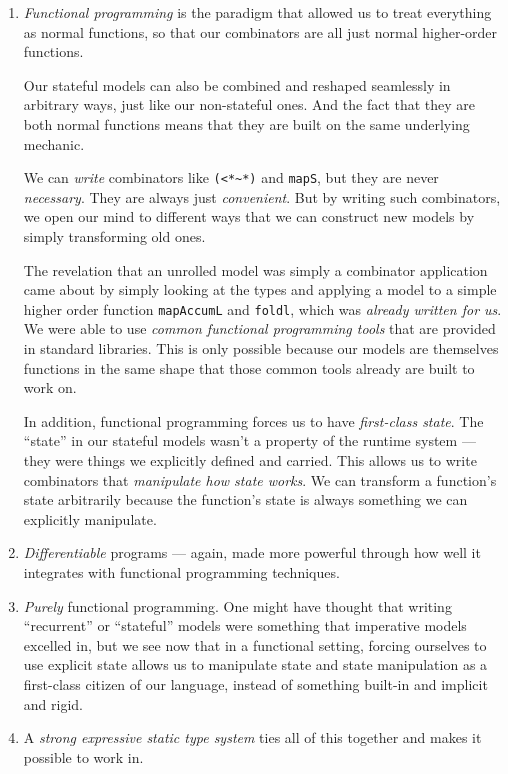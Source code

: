 \documentclass[]{article}
\begin{document}
\begin{enumerate}
\def\labelenumi{\arabic{enumi}.}
\item
  \emph{Functional programming} is the paradigm that allowed us to treat
  everything as normal functions, so that our combinators are all just normal
  higher-order functions.

  Our stateful models can also be combined and reshaped seamlessly in arbitrary
  ways, just like our non-stateful ones. And the fact that they are both normal
  functions means that they are built on the same underlying mechanic.

  We can \emph{write} combinators like \texttt{(\textless{}*\textasciitilde{}*)}
  and \texttt{mapS}, but they are never \emph{necessary}. They are always just
  \emph{convenient}. But by writing such combinators, we open our mind to
  different ways that we can construct new models by simply transforming old
  ones.

  The revelation that an unrolled model was simply a combinator application came
  about by simply looking at the types and applying a model to a simple higher
  order function \texttt{mapAccumL} and \texttt{foldl}, which was \emph{already
  written for us}. We were able to use \emph{common functional programming
  tools} that are provided in standard libraries. This is only possible because
  our models are themselves functions in the same shape that those common tools
  already are built to work on.

  In addition, functional programming forces us to have \emph{first-class
  state}. The ``state'' in our stateful models wasn't a property of the runtime
  system --- they were things we explicitly defined and carried. This allows us
  to write combinators that \emph{manipulate how state works}. We can transform
  a function's state arbitrarily because the function's state is always
  something we can explicitly manipulate.
\item
  \emph{Differentiable} programs --- again, made more powerful through how well
  it integrates with functional programming techniques.
\item
  \emph{Purely} functional programming. One might have thought that writing
  ``recurrent'' or ``stateful'' models were something that imperative models
  excelled in, but we see now that in a functional setting, forcing ourselves to
  use explicit state allows us to manipulate state and state manipulation as a
  first-class citizen of our language, instead of something built-in and
  implicit and rigid.
\item
  A \emph{strong expressive static type system} ties all of this together and
  makes it possible to work in.


\end{enumerate}
\end{document}
